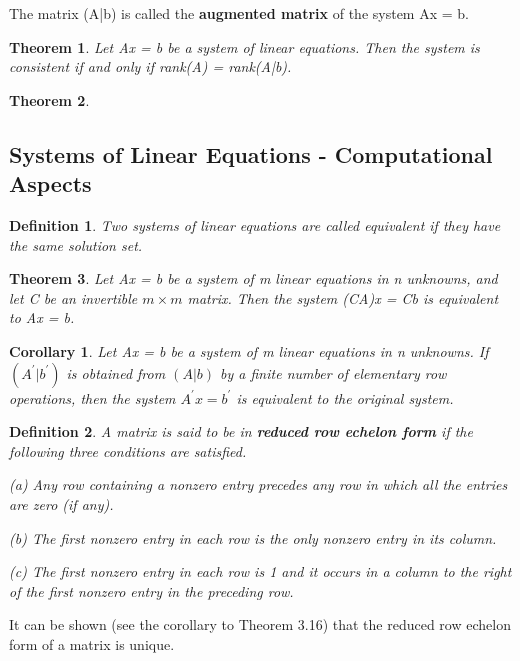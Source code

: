 \documentclass{article}
\newcommand{\bd}[1]{\textbf{#1}}
\theoremstyle{plain}
\newtheorem{theorem}{Theorem}[section]
\newtheorem*{corollary}{Corollary}
\newtheorem*{definition1}{Definition}
\theoremstyle{plain} %
\begin{document}
The matrix (A|b) is called the \bd{augmented matrix} of the system Ax = b.

\begin{theorem}
  Let Ax = b be a system of linear equations. Then the system is consistent if and only if rank(A) = rank(A|b).
\end{theorem}

\begin{theorem}
  
\end{theorem}

\subsection{Systems of Linear Equations - Computational Aspects}

\begin{definition1}
  Two systems of linear equations are called equivalent if they have the same solution set.
\end{definition1}

\begin{theorem}
  Let Ax = b be a system of m linear equations in n unknowns, and let C be an invertible $m \times m$ matrix. Then the system (CA)x = Cb is equivalent to Ax = b.
\end{theorem}

\begin{corollary}
  Let Ax = b be a system of m linear equations in n unknowns. If $(A^\prime|b^\prime)$ is obtained from $(A|b)$ by a finite number of elementary row operations, then the system $A^\prime x = b^\prime$ is equivalent to the original system.
\end{corollary}

\begin{definition1}
  A matrix is said to be in \bd{reduced row echelon form} if the following three conditions are satisfied.

(a) Any row containing a nonzero entry precedes any row in which all the entries are zero (if any).

(b) The first nonzero entry in each row is the only nonzero entry in its column.

(c) The first nonzero entry in each row is 1 and it occurs in a column to the right of the first nonzero entry in the preceding row.
\end{definition1}

It can be shown (see the corollary to Theorem 3.16) that the reduced row echelon form of a matrix is unique.
\end{document}
